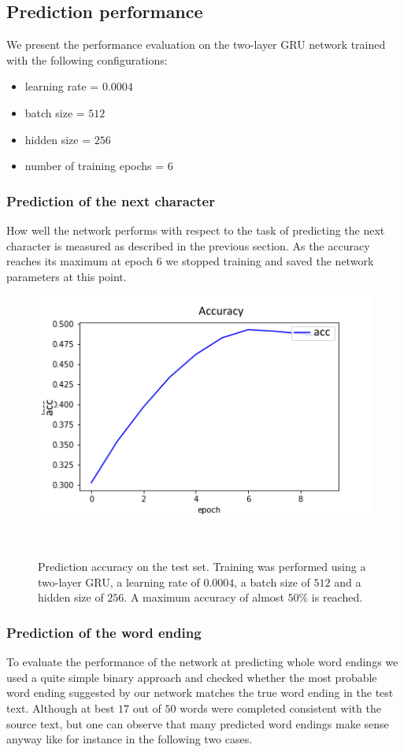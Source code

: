 \documentclass[11pt,a4paper,bibliography=totocnumbered,listof=totocnumbered]{scrartcl}
\begin{document}
\subsection{Prediction performance}
We present the performance evaluation on the two-layer GRU network trained with the following configurations:
\begin{itemize}
	\item learning rate = $0.0004$
	\item batch size = $512$
	\item hidden size = $256$
	\item number of training epochs = $6$
\end{itemize} 

\subsubsection{Prediction of the next character}
How well the network performs with respect to the task of predicting the next character is measured as described in the previous section. As the accuracy reaches its maximum at epoch 6 we stopped training and saved the network parameters at this point. 

\begin{figure}[!ht]
   \begin{minipage}{\textwidth}
     \centering
     \includegraphics[width=.4\textwidth]{acc_hs256_slow}
     \caption{Prediction accuracy on the test set. Training was performed using a two-layer GRU, a learning rate of $0.0004$, a batch size of $512$ and a hidden size of $256$. A maximum accuracy of almost $50\%$ is reached.}
     \label{fig:truenet}
   \end{minipage}\\[1em]   
\end{figure}

\subsubsection{Prediction of the word ending} \label{ssec:we}
To evaluate the performance of the network at predicting whole word endings we used a quite simple binary approach and checked whether the most probable word ending suggested by our network matches the true word ending in the test text. Although at best $17$ out of $50$ words were completed  consistent with the source text, but one can observe that many predicted word endings make sense anyway like for instance in the following two cases. \\
\end{document}
